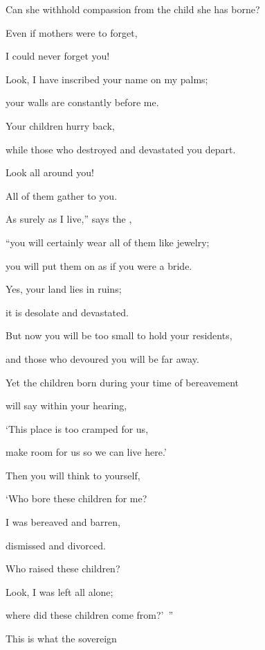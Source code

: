 {\par }{\Q Can she withhold compassion
from the child
she has borne?

\par }{\Q Even if
mothers were to forget,
\par }{\Q I
could never
forget you!
\par }{\Q {}Look,
I have inscribed
your name on
my palms;
\par }{\Q your walls
are constantly
before me.
\par }{\Q {}Your children
hurry
back,
\par }{\Q while those who destroyed
and devastated
you depart.
\par }{\Q {}Look
all around
you!

\par }{\Q All
of them gather
to you.
\par }{\Q As surely as I
live,”
says
the {},
\par }{\Q “you will certainly
wear all
of them like jewelry;
\par }{\Q you will put
them on as if you were a bride.
\par }{\Q {}Yes,
your land
lies in ruins;
\par }{\Q it is desolate
and devastated.
\par }{\Q But now
you will be too small to hold your residents,
\par }{\Q and those who devoured
you will be far away.
\par }{\Q {}Yet the children born during your time of bereavement
\par }{\Q will say
within your hearing,
\par }{\Q ‘This place
is too cramped
for us,

\par }{\Q make room for us so we can live here.’
\par }{\Q {}Then you will think
to yourself,

\par }{\Q ‘Who
bore
these
children
for me?
\par }{\Q I
was bereaved
and barren,
\par }{\Q dismissed
and divorced.
\par }{\Q Who
raised
these
children?
\par }{\Q Look,
I
was left
all alone;
\par }{\Q where
did these children come from?’ ”
\par }{\Q {}This is what
the sovereign

}
